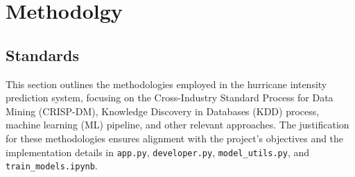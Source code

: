 %
%
%



\chapter{Methodolgy}

\section{Standards}
This section outlines the methodologies employed in the hurricane intensity prediction system, focusing on the Cross-Industry Standard Process for Data Mining (CRISP-DM), Knowledge Discovery in Databases (KDD) process, machine learning (ML) pipeline, and other relevant approaches. The justification for these methodologies ensures alignment with the project's objectives and the implementation details in \texttt{app.py}, \texttt{developer.py}, \texttt{model\_utils.py}, and \texttt{train\_models.ipynb}.

